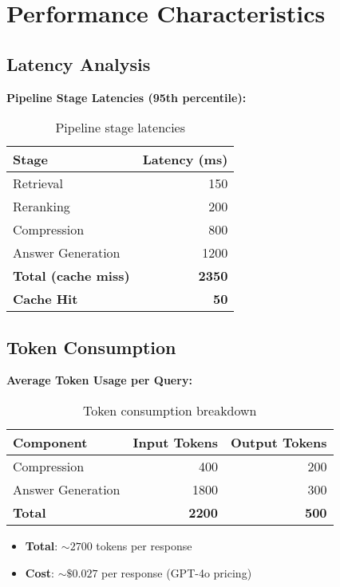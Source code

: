 \documentclass[11pt,a4paper]{article}
\begin{document}
\section{Performance Characteristics}

\subsection{Latency Analysis}

\textbf{Pipeline Stage Latencies (95th percentile):}
\begin{table}[H]
\centering
\begin{tabular}{@{}lr@{}}
\toprule
\textbf{Stage} & \textbf{Latency (ms)} \\
\midrule
Retrieval & 150 \\
Reranking & 200 \\
Compression & 800 \\
Answer Generation & 1200 \\
\midrule
\textbf{Total (cache miss)} & \textbf{2350} \\
\textbf{Cache Hit} & \textbf{50} \\
\bottomrule
\end{tabular}
\caption{Pipeline stage latencies}
\end{table}

\subsection{Token Consumption}

\textbf{Average Token Usage per Query:}
\begin{table}[H]
\centering
\begin{tabular}{@{}lrr@{}}
\toprule
\textbf{Component} & \textbf{Input Tokens} & \textbf{Output Tokens} \\
\midrule
Compression & 400 & 200 \\
Answer Generation & 1800 & 300 \\
\midrule
\textbf{Total} & \textbf{2200} & \textbf{500} \\
\bottomrule
\end{tabular}
\caption{Token consumption breakdown}
\end{table}

\begin{itemize}
    \item \textbf{Total}: $\sim2700$ tokens per response
    \item \textbf{Cost}: $\sim\$0.027$ per response (GPT-4o pricing)
\end{itemize}
\end{document}
